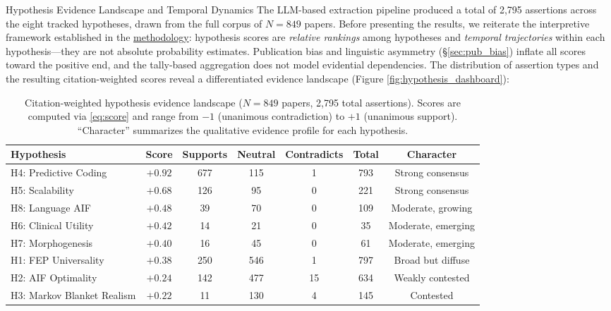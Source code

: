 \documentclass[
  ignorenonframetext,
]{beamer}
\author{\texorpdfstring{}{}}
\date{}
\begin{document}
\begin{frame}{Hypothesis Evidence Landscape and Temporal Dynamics
\label{sec:hypothesis_results}}
\protect{}\label{hypothesis-evidence-landscape-and-temporal-dynamics}
The LLM-based extraction pipeline produced a total of 2,795 assertions
across the eight tracked hypotheses, drawn from the full corpus of
\(N = 849\) papers. Before presenting the results, we reiterate the
interpretive framework established in the
\hyperref[sec:methods_kg]{methodology}: hypothesis scores are
\emph{relative rankings} among hypotheses and \emph{temporal
trajectories} within each hypothesis---they are not absolute probability
estimates. Publication bias and linguistic asymmetry
(\S\ref{sec:pub_bias}) inflate all scores toward the positive end, and
the tally-based aggregation does not model evidential dependencies. The
distribution of assertion types and the resulting citation-weighted
scores reveal a differentiated evidence landscape (Figure
\ref{fig:hypothesis_dashboard}):

\begin{table}[htbp]
\centering
\caption{Citation-weighted hypothesis evidence landscape ($N = 849$ papers, 2,795 total assertions). Scores are computed via \eqref{eq:score} and range from $-1$ (unanimous contradiction) to $+1$ (unanimous support). ``Character'' summarizes the qualitative evidence profile for each hypothesis.}
\label{tab:hypothesis_evidence}
\begin{tabular}{lcccccc}
\toprule
\textbf{Hypothesis} & \textbf{Score} & \textbf{Supports} & \textbf{Neutral} & \textbf{Contradicts} & \textbf{Total} & \textbf{Character} \\
\midrule
H4: Predictive Coding & $+0.92$ & 677 & 115 & 1 & 793 & Strong consensus \\
H5: Scalability & $+0.68$ & 126 & 95 & 0 & 221 & Strong consensus \\
H8: Language AIF & $+0.48$ & 39 & 70 & 0 & 109 & Moderate, growing \\
H6: Clinical Utility & $+0.42$ & 14 & 21 & 0 & 35 & Moderate, emerging \\
H7: Morphogenesis & $+0.40$ & 16 & 45 & 0 & 61 & Moderate, emerging \\
H1: FEP Universality & $+0.38$ & 250 & 546 & 1 & 797 & Broad but diffuse \\
H2: AIF Optimality & $+0.24$ & 142 & 477 & 15 & 634 & Weakly contested \\
H3: Markov Blanket Realism & $+0.22$ & 11 & 130 & 4 & 145 & Contested \\
\bottomrule
\end{tabular}
\end{table}


\end{frame}
\end{document}
